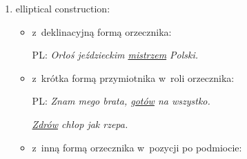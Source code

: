 \documentclass{udisc}
\begin{document}
\begin{enumerate}
\begin{itemize}
      \item with non-reflexive non-personal verb (PL: \textit{trzeba}, \textit{można}):

            \begin{ex}
            PL: \textit{\uline{Trzeba} to sobie umieć powiedzieć.}
            \end{ex}
            \begin{ex}
            PL: \textit{[...] że cierpieniem i patosem od myślenia wykręcić się \uline{można} [...]}
            \end{ex}

      \item With~the non-reflexive momentary verb:

            \begin{ex}
            PL: \textit{(Bierze igłę z nitką), \uline{ciach} mankiet lewy, (ciach prawy, łaty położył niebrzydko).} 
            \end{ex}
            \begin{ex}
            PL: \textit{\uline{Łap} za kota (i lu go na moje łóżko).}
            \end{ex}

      \end{itemize}

\item elliptical construction:

      \begin{itemize}

      \item z~deklinacyjną formą orzecznika:

            \begin{ex}
            PL: \textit{Orłoś jeździeckim \uline{mistrzem} Polski.}
            \end{ex}

      \item z~krótka formą przymiotnika w~roli orzecznika:

            \begin{ex}
            PL: \textit{Znam mego brata, \uline{gotów} na wszystko.}
            \end{ex}
            \begin{ex}
            \textit{\uline{Zdrów} chłop jak rzepa.}
            \end{ex}

      \item z~inną formą orzecznika w~pozycji po podmiocie:


\end{itemize}
\end{enumerate}
\end{document}
